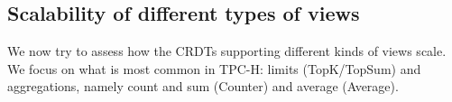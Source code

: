 \documentclass[sigplan,review,anonymous]{acmart}
\begin{document}
%
%

\subsection{Scalability of different types of views}
\label{subsec:microbenchmarks}

We now try to assess how the CRDTs supporting different kinds of views scale.
We focus on what is most common in TPC-H: limits (TopK/TopSum) and aggregations, namely count and sum (Counter) and average (Average).
\end{document}
